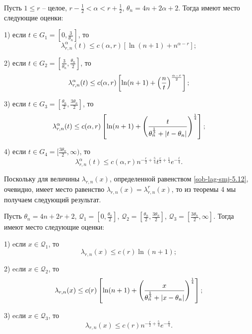 \begin{theorem}
 Пусть $1\le r$ -- целое, $r-\frac12<\alpha< r+\frac12$, $\theta_n=4n+2\alpha+2$. Тогда имеют место следующие оценки:

1) если $t \in G_1=[0,\frac3{\theta_n}]$,  то
\begin{equation*}
\lambda^\alpha_{r,n}(t) \leq c(\alpha,r)[\ln(n+1)+n^{\alpha-r}];
\end{equation*}

2) если $t \in G_2=[\frac3{\theta_n},\frac{\theta_n}2]$, то
\begin{equation*}
\lambda_{r,n}^\alpha(t) \leq c(\alpha,r)\left[\ln(n+1)+\left({n\over t}\right)^{\alpha-r\over2}\right];
\end{equation*}

3) если $t \in G_3=[\frac{\theta_n}2,\frac{3\theta_n}2]$, то
\begin{equation*}
\lambda_{r,n}^\alpha(t) \leq c(\alpha,r)\left[\ln(n+1)+\left({t\over \theta_n^{\frac13}+|t-\theta_n| }\right)^\frac14\right];
\end{equation*}

4) если $t \in G_4=[\frac{3\theta_n}2,\infty)$, то
\begin{equation*}
\lambda_{r,n}^\alpha(t) \leq c(\alpha,r)n^{-\frac{r}{2}+\frac54}t^{\frac r2+\frac14}e^{-\frac{t}{4}}.
\end{equation*}
\end{theorem}

Поскольку для величины $\lambda_{r,n}(x)$, определенной равенством \eqref{sob-lag-smj-5.12}, очевидно, имеет место равенство $\lambda_{r,n}(x)=\lambda_{r,n}^r(x)$, то из теоремы 4 мы получаем следующий результат.

\begin{theorem} Пусть
$\theta_n=4n+2r+2$, $\mathcal{Q}_1=[0,\frac{\theta_n}2]$, $\mathcal{Q}_2=[\frac{\theta_n}2,\frac{3\theta_n}2]$, $\mathcal{Q}_3=[\frac{3\theta_n}2,\infty]$. Тогда имеют место следующие оценки:

1) eсли $ x\in \mathcal{Q}_1$,  то
\begin{equation*}
\lambda_{r,n}(x) \leq c(r)\ln(n+1);
\label{sob-lag-smj-5.14}
\end{equation*}

2) ecли $x \in \mathcal{Q}_2$, то
\begin{equation*}
\lambda_{r,n}(x) \leq c(r)\left[\ln(n+1)+\left({x\over \theta_n^{\frac13}+|x-\theta_n| }\right)^\frac14\right];
\label{sob-lag-smj-5.15}
\end{equation*}

3) ecли $x\in \mathcal{Q}_3$, то
\begin{equation*}
\lambda_{r,n}(x) \leq c(r)n^{-\frac{r}{2}+\frac54}e^{-\frac{x}{4}}.
\label{sob-lag-smj-5.16}
\end{equation*}
\end{theorem}





